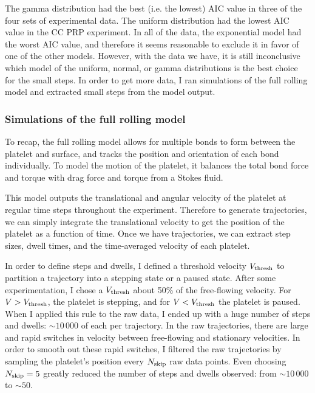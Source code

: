 \documentclass{article}
\newcommand{\tn}{\textnormal}
\begin{document}
The gamma distribution had the best (i.e. the lowest) AIC value in
three of the four sets of experimental data. The uniform distribution
had the lowest AIC value in the CC PRP experiment. In all of the data,
the exponential model had the worst AIC value, and therefore it seems
reasonable to exclude it in favor of one of the other models. However,
with the data we have, it is still inconclusive which model of the
uniform, normal, or gamma distributions is the best choice for the
small steps. In order to get more data, I ran simulations of the full
rolling model and extracted small steps from the model output.

\subsubsection{Simulations of the full rolling model}
\label{sec:simul-full-roll}

To recap, the full rolling model allows for multiple bonds to form
between the platelet and surface, and tracks the position and
orientation of each bond individually. To model the motion of the
platelet, it balances the total bond force and torque with drag force
and torque from a Stokes fluid.

This model outputs the translational and angular velocity of the
platelet at regular time steps throughout the experiment. Therefore to
generate trajectories, we can simply integrate the translational
velocity to get the position of the platelet as a function of
time. Once we have trajectories, we can extract step sizes, dwell
times, and the time-averaged velocity of each platelet.

In order to define steps and dwells, I defined a threshold velocity
$V_\tn{thresh}$ to partition a trajectory into a stepping state or a
paused state. After some experimentation, I chose a $V_\tn{thresh}$
about 50\% of the free-flowing velocity. For $V > V_\tn{thresh}$, the
platelet is stepping, and for $V < V_\tn{thresh}$ the platelet is
paused. When I applied this rule to the raw data, I ended up with a
huge number of steps and dwells: $\sim 10\,000$ of each per
trajectory. In the raw trajectories, there are large and rapid
switches in velocity between free-flowing and stationary
velocities. In order to smooth out these rapid switches, I filtered
the raw trajectories by sampling the platelet's position every
$N_\tn{skip}$ raw data points. Even choosing $N_\tn{skip} = 5$ greatly
reduced the number of steps and dwells observed: from $\sim 10\,000$
to $\sim 50$.
\end{document}

